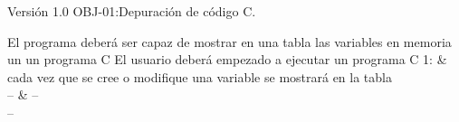 {Versión 1.0}
{OBJ-01:Depuración de código C.}
{\begin{description}
\item{}
\item{}
\item{}
\end{description}}
{El programa deberá ser capaz de mostrar en una tabla las variables en memoria un un programa C}
{El usuario deberá empezado a ejecutar un programa C}
{{1: & cada vez que se cree o modifique una variable se mostrará en la tabla \\}
{-- & --\\}}
{--}